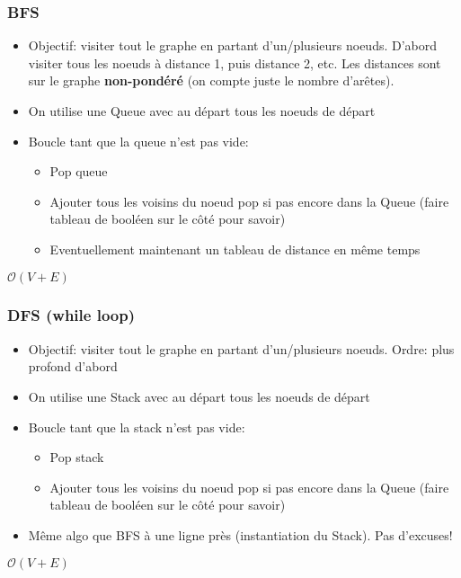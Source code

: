 \documentclass[8pt,aspectratio=169]{beamer}
\begin{document}
\begin{frame}
\frametitle{BFS}
\begin{itemize}
	\item Objectif: visiter tout le graphe en partant d'un/plusieurs noeuds. D'abord visiter tous les noeuds à distance 1, puis distance 2, etc. Les distances sont sur le graphe \textbf{non-pondéré} (on compte juste le nombre d'arêtes).
	\item On utilise une Queue avec au départ tous les noeuds de départ
	\item Boucle tant que la queue n'est pas vide:
		\begin{itemize}
			\item Pop queue
			\item Ajouter tous les voisins du noeud pop si pas encore dans la Queue (faire tableau de booléen sur le côté pour savoir)
			\item Eventuellement maintenant un tableau de distance en même temps
		\end{itemize}
\end{itemize}
$\mathcal{O}(V+E)$
\end{frame}

\begin{frame}
\frametitle{DFS (while loop)}
\begin{itemize}
	\item Objectif: visiter tout le graphe en partant d'un/plusieurs noeuds. Ordre: plus profond d'abord
	\item On utilise une Stack avec au départ tous les noeuds de départ
	\item Boucle tant que la stack n'est pas vide:
	\begin{itemize}
		\item Pop stack
		\item Ajouter tous les voisins du noeud pop si pas encore dans la Queue (faire tableau de booléen sur le côté pour savoir)
	\end{itemize}
	\item Même algo que BFS à une ligne près (instantiation du Stack). Pas d'excuses!
\end{itemize}
$\mathcal{O}(V+E)$
\end{frame}
\end{document}
